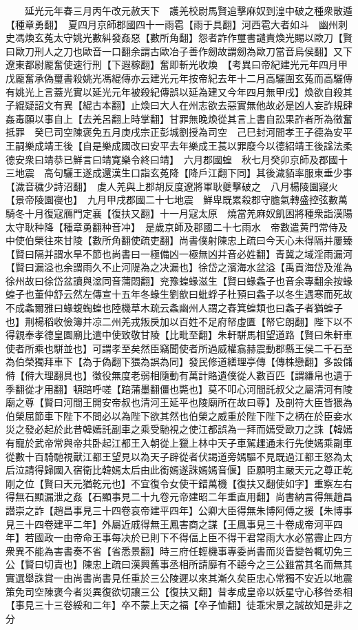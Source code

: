 　　延光元年春三月丙午改元赦天下　護羌校尉馬賢追擊麻奴到湟中破之種衆散遁【種章勇翻】　夏四月京師郡國四十一雨雹【雨于具翻】河西雹大者如斗　幽州刺史馮煥玄菟太守姚光數糾發姦惡【數所角翻】怨者詐作璽書譴責煥光賜以歐刀【賢曰歐刀刑人之刀也歐音一口翻余謂古歐冶子善作劒故謂劒為歐刀當音烏侯翻】又下遼東都尉龎奮使速行刑【下遐稼翻】奮即斬光收煥　【考異曰帝紀建光元年四月甲戊龎奮承偽璽書殺姚光馮緄傳亦云建光元年按帝紀去年十二月高驪圍玄菟而高驪傳有姚光上言蓋光實以延光元年被殺紀傳誤以延為建又今年四月無甲戌】煥欲自殺其子緄疑詔文有異【緄古本翻】止煥曰大人在州志欲去惡實無他故必是凶人妄詐規肆姦毒願以事自上【去羌呂翻上時掌翻】甘罪無晚煥從其言上書自訟果詐者所為徵奮抵罪　癸巳司空陳褒免五月庚戌宗正彭城劉授為司空　己巳封河間孝王子德為安平王嗣樂成靖王後【自是樂成國改曰安平去年樂成王萇以罪廢今以德紹靖王後諡法柔德安衆曰靖恭已鮮言曰靖寛樂令終曰靖】　六月郡國蝗　秋七月癸卯京師及郡國十三地震　高句驪王遂成還漢生口詣玄菟降【降戶江翻下同】其後濊貊率服東垂少事【濊音穢少詩沼翻】　䖍人羌與上郡胡反度遼將軍耿夔擊破之　八月楊陵園寢火【景帝陵園寑也】　九月甲戌郡國二十七地震　鮮卑既累殺郡守膽氣轉盛控弦數萬騎冬十月復寇鴈門定襄【復扶又翻】十一月寇太原　燒當羌麻奴飢困將種衆詣漢陽太守耿种降【種章勇翻种音冲】　是歲京師及郡國二十七雨水　帝數遣黄門常侍及中使伯榮往來甘陵【數所角翻使疏吏翻】尚書僕射陳忠上疏曰今天心未得隔并屢臻【賢曰隔并謂水旱不節也尚書曰一極備凶一極無凶并音必姓翻】青冀之域淫雨漏河【賢曰漏溢也余謂雨久不止河隄為之决漏也】徐岱之濱海水盆溢【禹貢海岱及淮為徐州故曰徐岱盆讀與湓同音蒲悶翻】兖豫蝗蝝滋生【賢曰蝝螽子也音余專翻余按蝝蝗子也董仲舒云然左傳宣十五年冬蝝生劉歆曰蚍蜉子杜預曰螽子以冬生遇寒而死故不成螽爾雅曰蝝蝮蜪蝗也陸機草木疏云螽幽州人謂之舂箕蝗類也曰螽子者猶蝗子也】荆楊稻收儉簿并凉二州羌戎叛戾加以百姓不足府帑虛匱【帑它朗翻】陛下以不得親奉孝德皇園廟比遣中使致敬甘陵【比毗至翻】朱軒駢馬相望道路【賢曰朱軒車使者所乘也駢並也】可謂孝至矣然臣竊聞使者所過威權翕赫震動郡縣王侯二千石至為伯榮獨拜車下【為于偽翻下猥為誤為同】發民修道繕理亭傳【傳株戀翻】多設儲偫【偫大理翻具也】徵役無度老弱相隨動有萬計賂遺僕從人數百匹【謂縑帛也遺于季翻從才用翻】頓踣呼嗟【踣蒲墨翻僵也斃也】莫不叩心河間託叔父之屬清河有陵廟之尊【賢曰河間王開安帝叔也清河王延平也陵廟所在故曰尊】及剖符大臣皆猥為伯榮屈節車下陛下不問必以為陛下欲其然也伯榮之威重於陛下陛下之柄在於臣妾水災之發必起於此昔韓嫣託副車之乘受馳視之使江都誤為一拜而嫣受歐刀之誅【韓嫣有寵於武帝常與帝共卧起江都王入朝從上獵上林中天子車駕䟆通未行先使嫣乘副車從數十百騎馳視獸江都王望見以為天子辟從者伏謁道旁嫣驅不見既過江都王怒為太后泣請得歸國入宿衛比韓嫣太后由此銜嫣遂誅嫣嫣音偃】臣願明主嚴天元之尊正乾剛之位【賢曰天元猶乾元也】不宜復令女使干錯萬機【復扶又翻使如字】重察左右得無石顯漏泄之姦【石顯事見二十九卷元帝建昭二年重直用翻】尚書納言得無趙昌譛崇之詐【趙昌事見三十四卷哀帝建平四年】公卿大臣得無朱博阿傅之援【朱博事見三十四卷建平二年】外屬近戚得無王鳳害商之謀【王鳳事見三十卷成帝河平四年】若國政一由帝命王事每决於已則下不得偪上臣不得干君常雨大水必當霽止四方衆異不能為害書奏不省【省悉景翻】時三府任輕機事專委尚書而災眚變咎輒切免三公【賢曰切責也】陳忠上疏曰漢興舊事丞相所請靡有不聼今之三公雖當其名而無其實選舉誅賞一由尚書尚書見任重於三公陵遲以來其漸久矣臣忠心常獨不安近以地震策免司空陳褒今者災異復欲切讓三公【復扶又翻】昔孝成皇帝以妖星守心移咎丞相【事見三十三卷綏和二年】卒不蒙上天之福【卒子恤翻】徒乖宋景之誠故知是非之分